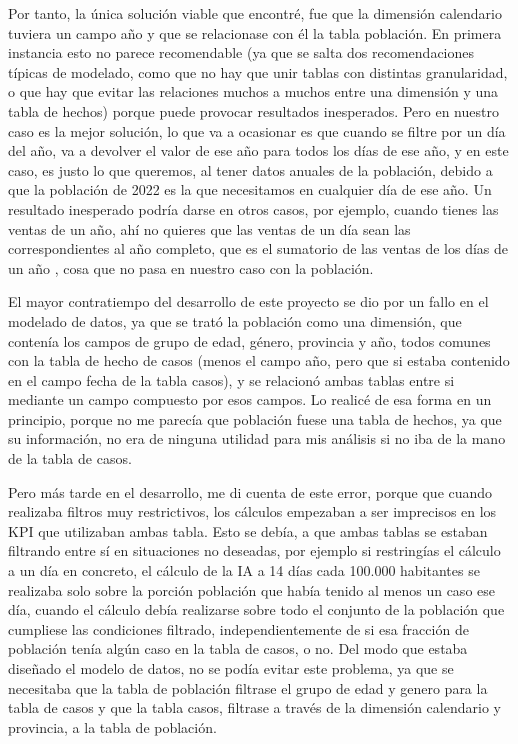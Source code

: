 Por tanto, la única solución viable que encontré, fue que la dimensión calendario tuviera un campo año y que se relacionase con él la tabla población. En primera instancia esto no parece recomendable (ya que se salta dos recomendaciones típicas de modelado, como que no hay que unir tablas con distintas granularidad, o que hay que evitar las relaciones muchos a muchos entre una dimensión y una tabla de hechos) porque puede provocar resultados inesperados. Pero en nuestro caso es la mejor solución,  lo que va a ocasionar es que cuando se filtre por un día del año, va a devolver el valor de ese año para todos los días de ese año, y en este caso, es justo lo que queremos, al tener datos anuales de la población, debido a que la población de 2022 es la que necesitamos en cualquier día de ese año. Un resultado inesperado podría darse en otros casos, por ejemplo, cuando tienes las ventas de un año, ahí no quieres que las ventas de un día sean las correspondientes al año completo, que es el sumatorio de las ventas de los días de un año , cosa que no pasa en nuestro caso con la población.

El mayor contratiempo del desarrollo de este proyecto se dio por un fallo en el modelado de datos, ya que se trató la población como una dimensión, que contenía los campos de grupo de edad, género, provincia y año, todos comunes con la tabla de hecho de casos (menos el campo año, pero que si estaba contenido en el campo fecha de la tabla casos), y se relacionó ambas tablas entre si mediante un campo compuesto por esos campos. Lo realicé de esa forma en un principio, porque no me parecía que población fuese una tabla de hechos, ya que su información, no era de ninguna utilidad para mis análisis si no iba de la mano de la tabla de casos.

Pero más tarde en el desarrollo, me di cuenta de este error, porque que cuando realizaba filtros muy restrictivos, los cálculos empezaban a ser imprecisos en los KPI que utilizaban ambas tabla. Esto se debía, a que ambas tablas se estaban filtrando entre sí en situaciones no deseadas, por ejemplo si restringías el cálculo a un día en concreto, el cálculo de la IA a 14 días cada 100.000 habitantes se realizaba solo sobre la porción población que había tenido al menos un caso ese día, cuando el cálculo debía realizarse sobre todo el conjunto de la población que cumpliese las condiciones filtrado, independientemente de si esa fracción de población tenía algún caso en la tabla de casos, o no. Del modo que estaba diseñado el modelo de datos, no se podía evitar este problema, ya que se necesitaba que la tabla de población filtrase el grupo de edad y genero para la tabla de casos y que la tabla casos, filtrase a través de la dimensión calendario y provincia, a la tabla de población.

